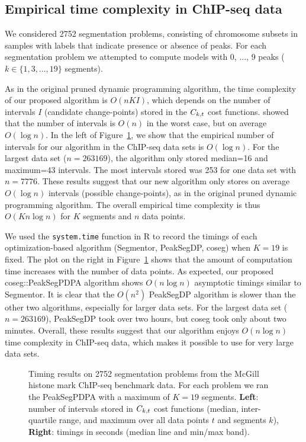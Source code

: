 \documentclass{article}
\begin{document}
\subsection{Empirical time complexity in ChIP-seq data}
\label{sec:results_time}

We considered 2752 segmentation problems, consisting of chromosome
subsets in samples with labels that indicate presence or absence of
peaks. For each segmentation problem we attempted to compute models
with 0, ..., 9 peaks ($k\in\{1,3,\dots,19\}$ segments).

As in the original pruned dynamic programming algorithm, the time
complexity of our proposed algorithm is $O(n K I)$, which depends on
the number of intervals $I$ (candidate change-points) stored in the
$C_{k,t}$ cost functions. \citet{pruned-dp-new} showed that the
number of intervals is $O(n)$ in the worst case, but on average
$O(\log n)$. In the left of Figure~\ref{fig:timings}, we show that the
empirical number of intervals for our algorithm in the ChIP-seq data
sets is $O(\log n)$. For the largest data set ($n=263169$), the
algorithm only stored median=16 and maximum=43 intervals. The most
intervals stored was 253 for one data set with $n=7776$. These results
suggest that our new algorithm only stores on average $O(\log n)$
intervals (possible change-points), as in the original pruned dynamic
programming algorithm. The overall empirical time complexity is thus
$O(K n \log n)$ for $K$ segments and $n$ data points.

We used the \verb|system.time| function in R to record the timings of
each optimization-based algorithm (Segmentor, PeakSegDP, coseg) when $K=19$ is fixed. The
plot on the right in Figure~\ref{fig:timings} shows that the amount of
computation time increases with the number of data points. As
expected, our proposed coseg::PeakSegPDPA algorithm shows $O(n\log n)$
asymptotic timings similar to Segmentor. It is clear that the $O(n^2)$
PeakSegDP algorithm is slower than the other two algorithms,
especially for larger data sets. For the largest data set
($n=263169$), PeakSegDP took over two hours, but coseg took only about
two minutes. Overall, these results suggest that our algorithm enjoys
$O(n\log n)$ time complexity in ChIP-seq data, which makes it possible
to use for very large data sets.

\begin{figure}[b!]
  \centering
  \parbox{0.49\textwidth}{
    
  }
  \parbox{0.49\textwidth}{
    
  }
  \vskip -0.5cm
  \caption{Timing results on 2752 segmentation problems from the
    McGill histone mark ChIP-seq benchmark data. For each problem we
    ran the PeakSegPDPA with a maximum of $K=19$ segments.
    \textbf{Left}: number of intervals stored in $C_{k,t}$ cost
    functions (median, inter-quartile range, and maximum over all data
    points $t$ and segments $k$), \textbf{Right}: timings in seconds
    (median line and min/max band).}
  \label{fig:timings}
\end{figure}
\end{document}

